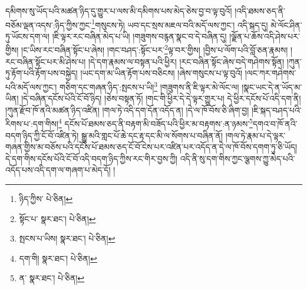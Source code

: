 དམིགས་སུ་ཡོད་པའི་མཚན་ཉིད་དུ་གྱུར་པ་ལས་མི་དམིགས་པས་མེད་ཅེས་བྱ་བ་ལྟ་བུའོ། །འདི་ཐམས་ཅད་ནི་བཅོམ་ལྡན་འདས་:ཉིད་ཀྱིས་ཀྱང་\footnote{ཉིད་ཀྱིས་  པེ་ཅིན། }གསུངས་ཏེ། ཡབ་དང་སྲས་མཇལ་བའི་མདོ་ལས་ཀྱང་། འདི་སྐད་དུ། མེ་ལོང་ཤིན་ཏུ་ཡོངས་དག་ལ། །ཇི་ལྟར་རང་བཞིན་མེད་པ་ཡི། །གཟུགས་བརྙན་སྣང་བ་དེ་བཞིན་དུ། །ལྗོན་པ་ཆོས་འདི་ཤེས་པར་གྱིས། །ང་ཡིས་རང་བཞིན་སྟོང་པ་ཞེས། །གང་བཤད་:སྟོང་པར་\footnote{སྟོང་པ་  སྣར་ཐང་།  པེ་ཅིན། }ལྟ་བར་གྱིས། །བྱིས་པ་ལོག་པའི་བློ་ཅན་རྣམས། །རང་བཞིན་སྟོང་པར་མི་ཤེས་པ། །དེ་དག་རྣམས་ལ་བསྟན་པའི་ཕྱིར། །རང་བཞིན་སྟོང་ཞེས་བདེ་གཤེགས་སྟོན། །ཀུན་ཏུ་རྟོག་པའི་རྟོག་པས་བསྐྱེད། །ཡང་དག་མ་ཡིན་རྟོག་པས་བཅིངས། །ཞེས་གསུངས་པ་ལྟ་བུའོ། །ལང་ཀར་གཤེགས་པའི་མདོ་ལས་ཀྱང་། གཅིག་དང་གཞན་ཉིད་:སྤངས་པ་ཡི།\footnote{སྤངས་པ་ཡིས།  སྣར་ཐང་།  པེ་ཅིན། } །གཟུགས་ནི་ཇི་ལྟར་མེ་ལོང་ལ། །སྣང་ཡང་དེ་ན་ཡོད་མ་ཡིན། །དེ་བཞིན་དངོས་པོའི་ངོ་བོ་ཉིད། །ཅེས་བསྟན་ཏོ། །གང་གི་ཕྱིར་དེ་དེ་ལྟར་གྱུར་པ། དེ་ཕྱིར་དངོས་པོ་འདི་དག་ནི། །ཀུན་རྫོབ་ཁོ་ནའི་མཚན་ཉིད་འཛིན། །གལ་ཏེ་འདི་དག་དོན་འདོད་ན། །དེ་ལ་ཁོ་བོས་ཅི་ཞིག་བྱ། །ཇི་སྐད་བཤད་པའི་རིགས་པ་:དག་གིས།\footnote{དག་གི།  སྣར་ཐང་།  པེ་ཅིན། } དངོས་པོ་ཐམས་ཅད་ནི་བརྟག་མི་བཟོད་པའི་ཕྱིར་མ་བརྟགས་:ན་ཉམས་\footnote{ན་  སྣར་ཐང་།  པེ་ཅིན། }དགའ་བ་ཁོ་ནའི་བདག་ཉིད་ཀྱི་ངོ་བོ་འཛིན་ཏེ། སྒྱུ་མའི་གླང་པོ་ཆེ་དང་རྟ་དང་མི་ལ་སོགས་པ་བཞིན་ནོ། །གལ་ཏེ་རྣམ་པ་དེ་ལྟར་གཞན་གྱིས་མ་བཅོས་པའི་དངོས་པོ་ཐམས་ཅད་ངོ་བོ་ངེས་པར་འཛིན་པར་འདོད་ན་དེ་ལ་ཁོ་བོས་དགག་ཏུ་ཅི་ཡོད། དེ་དག་གིས་དངོས་པོའི་ངོ་བོ་འདི་བདག་ཉིད་ཀྱིས་རང་གིར་བྱས་ཀྱི། འདི་ནི་སུ་དག་གིས་ཀྱང་ལྕགས་ཀྱུ་མེད་པའི་འདོད་པས་འདི་དག་ལ་གཞག་པ་མེད་དོ། །
